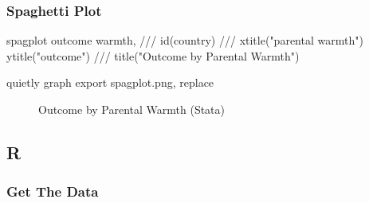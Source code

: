 \documentclass[
  letterpaper,
  DIV=11,
  numbers=noendperiod]{scrreprt}
\newenvironment{Shaded}{\begin{snugshade}}{\end{snugshade}}
\newcommand{\BaseNTok}[1]{\textcolor[rgb]{0.68,0.00,0.00}{#1}}
\newcommand{\CommentTok}[1]{\textcolor[rgb]{0.37,0.37,0.37}{#1}}
\newcommand{\KeywordTok}[1]{\textcolor[rgb]{0.00,0.23,0.31}{#1}}
\newcommand{\NormalTok}[1]{\textcolor[rgb]{0.00,0.23,0.31}{#1}}
\newcommand{\StringTok}[1]{\textcolor[rgb]{0.13,0.47,0.30}{#1}}
\begin{document}
\subsubsection{Spaghetti Plot}\label{spaghetti-plot}

\begin{Shaded}
\begin{Highlighting}[]
\NormalTok{spagplot outcome warmth, }\CommentTok{///}
\NormalTok{  id(country) }\CommentTok{///}
  \BaseNTok{xtitle}\NormalTok{(}\StringTok{"parental warmth"}\NormalTok{) }\BaseNTok{ytitle}\NormalTok{(}\StringTok{"outcome"}\NormalTok{) }\CommentTok{///}
  \BaseNTok{title}\NormalTok{(}\StringTok{"Outcome by Parental Warmth"}\NormalTok{) }

\KeywordTok{quietly} \KeywordTok{graph} \KeywordTok{export}\NormalTok{ spagplot.png, }\KeywordTok{replace}
\end{Highlighting}
\end{Shaded}

\begin{figure}


\caption{\label{fig-Stataspagplot}Outcome by Parental Warmth (Stata)}

\end{figure}%

\subsection{R}

\subsubsection{Get The Data}\label{get-the-data-7}
\end{document}
